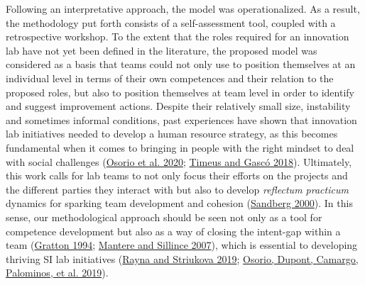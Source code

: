 \documentclass[AMA,STIX1COL,APA,STIX2COL]{WileyNJD-v2}
\begin{document}
Following an interpretative approach, the model was operationalized. As
a result, the methodology put forth consists of a self-assessment tool,
coupled with a retrospective workshop. To the extent that the roles
required for an innovation lab have not yet been defined in the
literature, the proposed model was considered as a basis that teams
could not only use to position themselves at an individual level in
terms of their own competences and their relation to the proposed roles,
but also to position themselves at team level in order to identify and
suggest improvement actions. Despite their relatively small size,
instability and sometimes informal conditions, past experiences have
shown that innovation lab initiatives needed to develop a human resource
strategy, as this becomes fundamental when it comes to bringing in
people with the right mindset to deal with social challenges
(\protect\hyperlink{ref-Osorio2020}{Osorio et al. 2020};
\protect\hyperlink{ref-Timeus2018}{Timeus and Gascó 2018}). Ultimately,
this work calls for lab teams to not only focus their efforts on the
projects and the different parties they interact with but also to
develop \emph{reflectum practicum} dynamics for sparking team
development and cohesion (\protect\hyperlink{ref-Sandberg2000}{Sandberg
2000}). In this sense, our methodological approach should be seen not
only as a tool for competence development but also as a way of closing
the intent-gap within a team
(\protect\hyperlink{ref-Gratton1994}{Gratton 1994};
\protect\hyperlink{ref-Mantere2007}{Mantere and Sillince 2007}), which
is essential to developing thriving SI lab initiatives
(\protect\hyperlink{ref-Rayna2019}{Rayna and Striukova 2019};
\protect\hyperlink{ref-Osorio2019}{Osorio, Dupont, Camargo, Palominos,
et al. 2019}).
\end{document}
